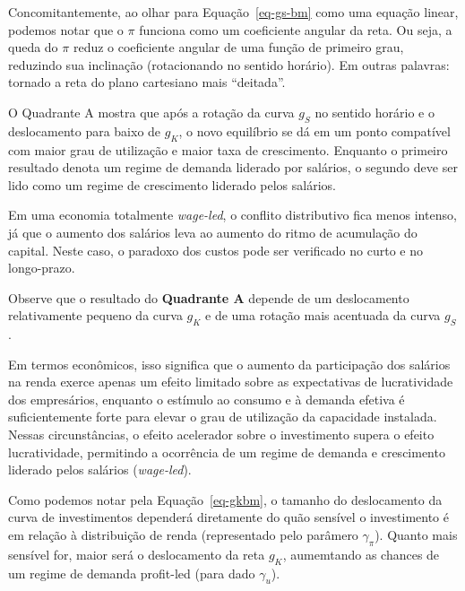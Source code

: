 \documentclass[
  brazilian,
  letterpaper,
  DIV=11,
  numbers=noendperiod]{scrreprt}
\begin{document}
Concomitantemente, ao olhar para Equação~\ref{eq-gs-bm} como uma equação
linear, podemos notar que o \(\pi\) funciona como um coeficiente angular
da reta. Ou seja, a queda do \(\pi\) reduz o coeficiente angular de uma
função de primeiro grau, reduzindo sua inclinação (rotacionando no
sentido horário). Em outras palavras: tornado a reta do plano cartesiano
mais ``deitada''.

O Quadrante A mostra que após a rotação da curva \(g_S\) no sentido
horário e o deslocamento para baixo de \(g_K\), o novo equilíbrio se dá
em um ponto compatível com maior grau de utilização e maior taxa de
crescimento. Enquanto o primeiro resultado denota um regime de demanda
liderado por salários, o segundo deve ser lido como um regime de
crescimento liderado pelos salários.

Em uma economia totalmente \emph{wage-led}, o conflito distributivo fica
menos intenso, já que o aumento dos salários leva ao aumento do ritmo de
acumulação do capital. Neste caso, o paradoxo dos custos pode ser
verificado no curto e no longo-prazo.

\begin{tcolorbox}[enhanced jigsaw, arc=.35mm, bottomrule=.15mm, bottomtitle=1mm, breakable, colback=white, colbacktitle=quarto-callout-warning-color!10!white, colframe=quarto-callout-warning-color-frame, coltitle=black, left=2mm, leftrule=.75mm, opacityback=0, opacitybacktitle=0.6, rightrule=.15mm, title=\textcolor{quarto-callout-warning-color}{\faExclamationTriangle}\hspace{0.5em}{Atenção}, titlerule=0mm, toprule=.15mm, toptitle=1mm]

Observe que o resultado do \textbf{Quadrante A} depende de um
deslocamento relativamente pequeno da curva \(g_K\) e de uma rotação
mais acentuada da curva \(g_S\).

Em termos econômicos, isso significa que o aumento da participação dos
salários na renda exerce apenas um efeito limitado sobre as expectativas
de lucratividade dos empresários, enquanto o estímulo ao consumo e à
demanda efetiva é suficientemente forte para elevar o grau de utilização
da capacidade instalada. Nessas circunstâncias, o efeito acelerador
sobre o investimento supera o efeito lucratividade, permitindo a
ocorrência de um regime de demanda e crescimento liderado pelos salários
(\emph{wage-led}).

\end{tcolorbox}

Como podemos notar pela Equação~\ref{eq-gkbm}, o tamanho do deslocamento
da curva de investimentos dependerá diretamente do quão sensível o
investimento é em relação à distribuição de renda (representado pelo
parâmero \(\gamma_\pi\)). Quanto mais sensível for, maior será o
deslocamento da reta \(g_K\), aumemtando as chances de um regime de
demanda profit-led (para dado \(\gamma_u\)).
\end{document}
